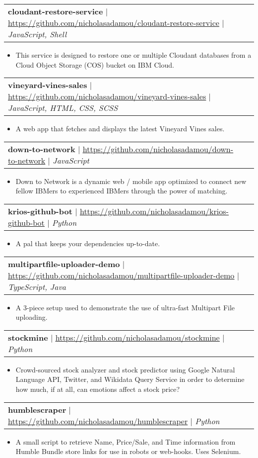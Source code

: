 \documentclass[letterpaper,11pt]{article}
\makeatletter
\newcommand{\resumeItemBulletless}[1]{
  \item[] \small{
    {#1 \vspace{-2pt}}
  }
}
\newcommand{\resumeProjectHeading}[2]{
    \item
    \begin{tabular*}{0.97\textwidth}{l@{\extracolsep{\fill}}r}
      \small#1 & #2 \\
    \end{tabular*}\vspace{-7pt}
}
\newcommand{\resumeItemListStart}{\begin{itemize}[rightmargin=\dimexpr\linewidth-17.25cm-\leftmargin\relax]}
\newcommand{\resumeItemListEnd}{\end{itemize}\vspace{-5pt}}
\makeatother
\begin{document}
\resumeProjectHeading
{\textbf{cloudant-restore-service} $|$ \href{https://github.com/nicholasadamou/cloudant-restore-service}{\underline{https://github.com/nicholasadamou/cloudant-restore-service}} $|$ \emph{JavaScript, Shell}}{}
\resumeItemListStart
\resumeItemBulletless{This service is designed to restore one or multiple Cloudant databases from a Cloud Object Storage (COS) bucket on IBM Cloud.}
\resumeItemListEnd

\resumeProjectHeading
{\textbf{vineyard-vines-sales} $|$ \href{https://github.com/nicholasadamou/vineyard-vines-sales}{\underline{https://github.com/nicholasadamou/vineyard-vines-sales}} $|$ \emph{JavaScript, HTML, CSS, SCSS}}{}
\resumeItemListStart
\resumeItemBulletless{A web app that fetches and displays the latest Vineyard Vines sales.}
\resumeItemListEnd

\resumeProjectHeading
{\textbf{down-to-network} $|$ \href{https://github.com/nicholasadamou/down-to-network}{\underline{https://github.com/nicholasadamou/down-to-network}} $|$ \emph{JavaScript}}{}
\resumeItemListStart
\resumeItemBulletless{Down to Network is a dynamic web / mobile app optimized to connect new fellow IBMers to experienced IBMers through the power of matching.}
\resumeItemListEnd

\resumeProjectHeading
{\textbf{krios-github-bot} $|$ \href{https://github.com/nicholasadamou/krios-github-bot}{\underline{https://github.com/nicholasadamou/krios-github-bot}} $|$ \emph{Python}}{}
\resumeItemListStart
\resumeItemBulletless{A pal that keeps your dependencies up-to-date.}
\resumeItemListEnd

\resumeProjectHeading
{\textbf{multipartfile-uploader-demo} $|$ \href{https://github.com/nicholasadamou/multipartfile-uploader-demo}{\underline{https://github.com/nicholasadamou/multipartfile-uploader-demo}} $|$ \emph{TypeScript, Java}}{}
\resumeItemListStart
\resumeItemBulletless{A 3-piece setup used to demonstrate the use of ultra-fast Multipart File uploading.}
\resumeItemListEnd

\resumeProjectHeading
{\textbf{stockmine} $|$ \href{https://github.com/nicholasadamou/stockmine}{\underline{https://github.com/nicholasadamou/stockmine}} $|$ \emph{Python}}{}
\resumeItemListStart
\resumeItemBulletless{Crowd-sourced stock analyzer and stock predictor using Google Natural Language API, Twitter, and Wikidata Query Service in order to determine how much, if at all, can emotions affect a stock price?}
\resumeItemListEnd

\resumeProjectHeading
{\textbf{humblescraper} $|$ \href{https://github.com/nicholasadamou/humblescraper}{\underline{https://github.com/nicholasadamou/humblescraper}} $|$ \emph{Python}}{}
\resumeItemListStart
\resumeItemBulletless{A small script to retrieve Name, Price/Sale, and Time information from Humble Bundle store links for use in robots or web-hooks. Uses Selenium.}
\resumeItemListEnd
\end{document}
